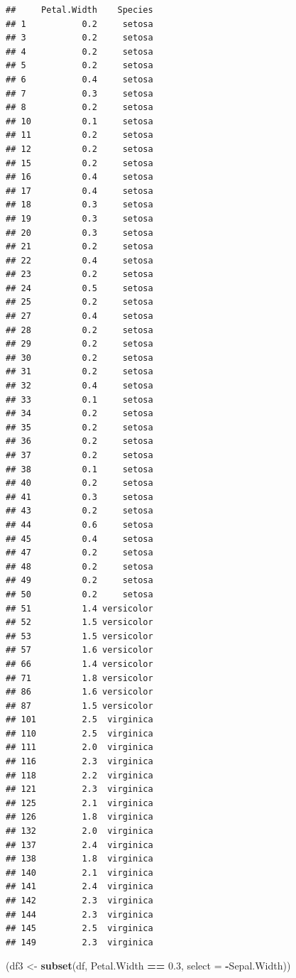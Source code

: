 \documentclass[
]{book}
\newenvironment{Shaded}{\begin{snugshade}}{\end{snugshade}}
\newcommand{\AttributeTok}[1]{\textcolor[rgb]{0.13,0.29,0.53}{#1}}
\newcommand{\FloatTok}[1]{\textcolor[rgb]{0.00,0.00,0.81}{#1}}
\newcommand{\FunctionTok}[1]{\textcolor[rgb]{0.13,0.29,0.53}{\textbf{#1}}}
\newcommand{\NormalTok}[1]{#1}
\newcommand{\OtherTok}[1]{\textcolor[rgb]{0.56,0.35,0.01}{#1}}
\newcommand{\SpecialCharTok}[1]{\textcolor[rgb]{0.81,0.36,0.00}{\textbf{#1}}}
\begin{document}
\begin{verbatim}
##     Petal.Width    Species
## 1           0.2     setosa
## 3           0.2     setosa
## 4           0.2     setosa
## 5           0.2     setosa
## 6           0.4     setosa
## 7           0.3     setosa
## 8           0.2     setosa
## 10          0.1     setosa
## 11          0.2     setosa
## 12          0.2     setosa
## 15          0.2     setosa
## 16          0.4     setosa
## 17          0.4     setosa
## 18          0.3     setosa
## 19          0.3     setosa
## 20          0.3     setosa
## 21          0.2     setosa
## 22          0.4     setosa
## 23          0.2     setosa
## 24          0.5     setosa
## 25          0.2     setosa
## 27          0.4     setosa
## 28          0.2     setosa
## 29          0.2     setosa
## 30          0.2     setosa
## 31          0.2     setosa
## 32          0.4     setosa
## 33          0.1     setosa
## 34          0.2     setosa
## 35          0.2     setosa
## 36          0.2     setosa
## 37          0.2     setosa
## 38          0.1     setosa
## 40          0.2     setosa
## 41          0.3     setosa
## 43          0.2     setosa
## 44          0.6     setosa
## 45          0.4     setosa
## 47          0.2     setosa
## 48          0.2     setosa
## 49          0.2     setosa
## 50          0.2     setosa
## 51          1.4 versicolor
## 52          1.5 versicolor
## 53          1.5 versicolor
## 57          1.6 versicolor
## 66          1.4 versicolor
## 71          1.8 versicolor
## 86          1.6 versicolor
## 87          1.5 versicolor
## 101         2.5  virginica
## 110         2.5  virginica
## 111         2.0  virginica
## 116         2.3  virginica
## 118         2.2  virginica
## 121         2.3  virginica
## 125         2.1  virginica
## 126         1.8  virginica
## 132         2.0  virginica
## 137         2.4  virginica
## 138         1.8  virginica
## 140         2.1  virginica
## 141         2.4  virginica
## 142         2.3  virginica
## 144         2.3  virginica
## 145         2.5  virginica
## 149         2.3  virginica
\end{verbatim}

\begin{Shaded}
\begin{Highlighting}[]
\NormalTok{(df3 }\OtherTok{\textless{}{-}} \FunctionTok{subset}\NormalTok{(df, Petal.Width }\SpecialCharTok{==} \FloatTok{0.3}\NormalTok{, }\AttributeTok{select =} \SpecialCharTok{{-}}\NormalTok{Sepal.Width))}
\end{Highlighting}
\end{Shaded}
\end{document}
